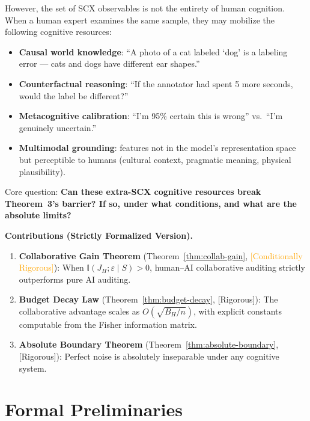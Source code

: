 \documentclass[12pt,a4paper]{article}
\newcommand{\rigorous}{\textcolor{green!50!black}{\small\textsf{[Rigorous]}}}
\newcommand{\conditionallyrigorous}{\textcolor{orange}{\small\textsf{[Conditionally Rigorous]}}}
\newcommand{\I}{\mathbb{I}}
\begin{document}
However, the set of SCX observables is not the entirety of human cognition. When a human expert examines the same sample, they may mobilize the following cognitive resources:
\begin{itemize}
    \item \textbf{Causal world knowledge}: ``A photo of a cat labeled `dog' is a labeling error --- cats and dogs have different ear shapes.''
    \item \textbf{Counterfactual reasoning}: ``If the annotator had spent 5 more seconds, would the label be different?''
    \item \textbf{Metacognitive calibration}: ``I'm 95\% certain this is wrong'' vs.\ ``I'm genuinely uncertain.''
    \item \textbf{Multimodal grounding}: features not in the model's representation space but perceptible to humans (cultural context, pragmatic meaning, physical plausibility).
\end{itemize}

Core question: \textbf{Can these extra-SCX cognitive resources break Theorem~3's barrier? If so, under what conditions, and what are the absolute limits?}

\medskip\noindent
\textbf{Contributions (Strictly Formalized Version).}
\begin{enumerate}[label=(\arabic*)]
    \item \textbf{Collaborative Gain Theorem} (Theorem~\ref{thm:collab-gain}, \conditionallyrigorous):
          When $\I(J_H; \varepsilon \mid S) > 0$, human--AI collaborative auditing strictly outperforms pure AI auditing.
    \item \textbf{Budget Decay Law} (Theorem~\ref{thm:budget-decay}, \rigorous):
          The collaborative advantage scales as $O(\sqrt{B_H/n})$, with explicit constants computable from the Fisher information matrix.
    \item \textbf{Absolute Boundary Theorem} (Theorem~\ref{thm:absolute-boundary}, \rigorous):
          Perfect noise is absolutely inseparable under any cognitive system.
\end{enumerate}

\section{Formal Preliminaries}
\end{document}

